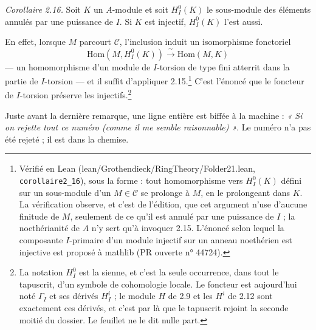 \documentclass[11pt,a4paper]{article}
\begin{document}
\emph{Corollaire 2.16.} Soit $K$ un $A$-module et soit $H^{0}_{I}(K)$ le
sous-module des éléments annulés par une puissance de $I$. Si $K$ est injectif,
$H^{0}_{I}(K)$ l'est aussi.

En effet, lorsque $M$ parcourt $\mathcal{C}$, l'inclusion induit un
isomorphisme fonctoriel
\[
  \mathrm{Hom}(M, H^{0}_{I}(K)) \xrightarrow{\ \sim\ } \mathrm{Hom}(M,K)
\]
— un homomorphisme d'un module de $I$-torsion de type fini
atterrit dans la partie de $I$-torsion — et il suffit d'appliquer 2.15.\footnote{Vérifié
en Lean (lean/Grothendieck/RingTheory/Folder21.lean, \texttt{corollaire2\_16}), sous la
forme : tout homomorphisme vers $H^{0}_{I}(K)$ défini sur un sous-module d'un
$M \in \mathcal{C}$ se prolonge à $M$, en le prolongeant dans $K$. La
vérification observe, et c'est de l'édition, que cet argument n'use d'aucune
finitude de $M$, seulement de ce qu'il est annulé par une puissance de $I$ ; la
noethérianité de $A$ n'y sert qu'à invoquer 2.15. L'énoncé selon lequel la
composante $I$-primaire d'un module injectif sur un anneau noethérien est
injective est proposé à mathlib (PR ouverte n° 44724).}
C'est l'énoncé que le foncteur de $I$-torsion préserve les
injectifs.\footnote{La notation $H^{0}_{I}$ est la sienne, et c'est la seule
occurrence, dans tout le tapuscrit, d'un symbole de cohomologie locale. Le
foncteur est aujourd'hui noté $\Gamma_{I}$ et ses dérivés $H^{i}_{I}$ ; le
module $H$ de 2.9 et les $H^{i}$ de 2.12 sont exactement ces dérivés, et c'est
par là que le tapuscrit rejoint la seconde moitié du dossier. Le feuillet ne le
dit nulle part.}

Juste avant la dernière remarque, une ligne entière est biffée à la machine :
\emph{« Si on rejette tout ce numéro (comme il me semble raisonnable) »}. Le
numéro n'a pas été rejeté ; il est dans la chemise.
\end{document}
